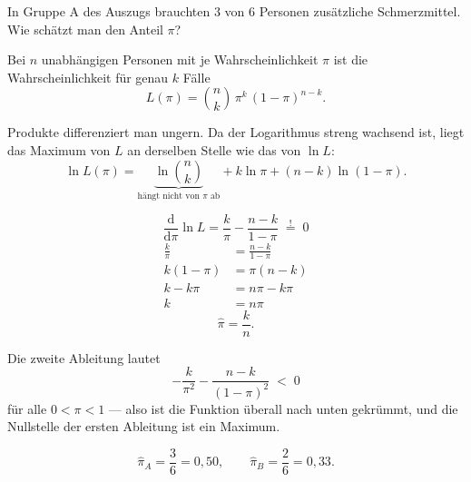 \begin{merksatz}
In Gruppe A des Auszugs brauchten $3$ von $6$ Personen zusätzliche Schmerzmittel. Wie schätzt man den Anteil $\pi$?

Bei $n$ unabhängigen Personen mit je Wahrscheinlichkeit $\pi$ ist die Wahrscheinlichkeit für genau $k$ Fälle
\[ L(\pi) = \binom{n}{k}\,\pi^k\,(1-\pi)^{n-k} . \]

Produkte differenziert man ungern. Da der Logarithmus streng wachsend ist, liegt das Maximum von $L$ an derselben Stelle wie das von $\ln L$:
\[ \ln L(\pi) = \underbrace{\ln\binom{n}{k}}_{\text{hängt nicht von } \pi \text{ ab}} + k\ln\pi + (n-k)\ln(1-\pi) . \]

\[ \frac{\mathrm{d}}{\mathrm{d}\pi}\ln L = \frac{k}{\pi} - \frac{n-k}{1-\pi} \;\stackrel{!}{=}\; 0 \]
\begin{align*}
\frac{k}{\pi} &= \frac{n-k}{1-\pi}\\
k(1-\pi) &= \pi(n-k)\\
k - k\pi &= n\pi - k\pi\\
k &= n\pi
\end{align*}
\[ \hat\pi = \frac{k}{n} . \]

Die zweite Ableitung lautet
\[ -\frac{k}{\pi^2} - \frac{n-k}{(1-\pi)^2} \;<\; 0 \]
für alle $0 < \pi < 1$ --- also ist die Funktion überall nach unten gekrümmt, und die Nullstelle der ersten Ableitung ist ein Maximum. \checkmark

\[ \hat\pi_A = \frac{3}{6} = 0{,}50, \qquad \hat\pi_B = \frac{2}{6} = 0{,}33 . \]

\begin{center}
\begin{minipage}{0.88\textwidth}
\end{minipage}
\end{center}
\end{merksatz}

